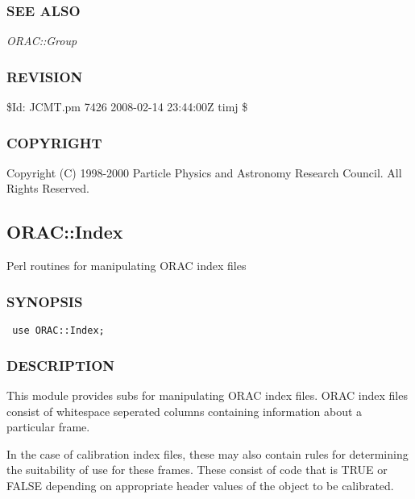 \begin{description}
\subsubsection*{SEE ALSO\label{ORAC::Group::JCMT_SEE_ALSO}}


\emph{ORAC::Group}

\subsubsection*{REVISION\label{ORAC::Group::JCMT_REVISION}}


\$Id: JCMT.pm 7426 2008-02-14 23:44:00Z timj \$

\subsubsection*{COPYRIGHT\label{ORAC::Group::JCMT_COPYRIGHT}}


Copyright (C) 1998-2000 Particle Physics and Astronomy Research
Council. All Rights Reserved.

\subsection{ORAC::Index\label{ORAC::Index}}


Perl routines for manipulating ORAC index files

\subsubsection*{SYNOPSIS\label{ORAC::Index_SYNOPSIS}}
\begin{verbatim}
 use ORAC::Index;
\end{verbatim}
\subsubsection*{DESCRIPTION\label{ORAC::Index_DESCRIPTION}}


This module provides subs for manipulating ORAC index files. ORAC
index files consist of whitespace seperated columns containing
information about a particular frame.



In the case of calibration index files, these may also contain rules
for determining the suitability of use for these frames. These consist
of code that is TRUE or FALSE depending on appropriate header values
of the object to be calibrated.


\end{description}
